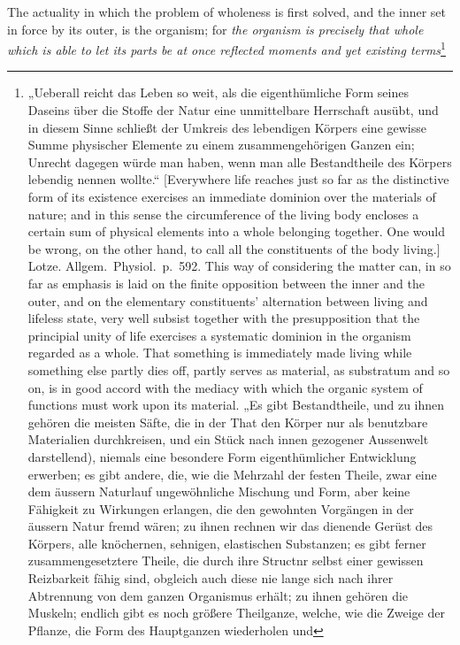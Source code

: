 \documentclass[12pt,a4paper]{book}
\begin{document}
The actuality in which the problem of wholeness is first solved, and the inner
set in force by its outer, is the organism; for \emph{the organism is precisely
that whole which is able to let its parts be at once reflected moments and yet
existing terms}\footnote{„Ueberall reicht das Leben so
weit, als die eigenthümliche Form seines Daseins über die Stoffe der
Natur eine unmittelbare Herrschaft ausübt, und in diesem Sinne schließt
der Umkreis des lebendigen Körpers eine gewisse Summe physischer
Elemente zu einem zusammengehörigen Ganzen ein; Unrecht dagegen würde
man haben, wenn man alle Bestandtheile des Körpers lebendig nennen
wollte.“ [Everywhere life reaches just so far as the distinctive form of its
existence exercises an immediate dominion over the materials of nature; and in
this sense the circumference of the living body encloses a certain sum of
physical elements into a whole belonging together. One would be wrong, on the
other hand, to call all the constituents of the body living.] Lotze. Allgem.\
Physiol.\ p.~592. This way of considering the matter can, in so far as emphasis
is laid on the finite opposition between the inner and the outer, and on the
elementary constituents' alternation between living and lifeless state, very
well subsist together with the presupposition that the principial unity of life
exercises a systematic dominion in the organism regarded as a whole. That
something is immediately made living while something else partly dies off,
partly serves as material, as substratum and so on, is in good accord with the
mediacy with which the organic system of functions must work upon its material.
„Es gibt Bestandtheile, und
zu ihnen gehören die meisten Säfte, die in der That den Körper nur als
benutzbare Materialien durchkreisen, und ein Stück nach innen gezogener
Aussenwelt darstellend), niemals eine besondere Form eigenthümlicher
Entwicklung erwerben; es gibt andere, die, wie die Mehrzahl der festen
Theile, zwar eine dem äussern Naturlauf ungewöhnliche Mischung und Form,
aber keine Fähigkeit zu Wirkungen erlangen, die den gewohnten Vorgängen
in der äussern Natur fremd wären; zu ihnen rechnen wir das dienende
Gerüst des Körpers, alle knöchernen, sehnigen, elastischen Substanzen;
es gibt ferner zusammengesetztere Theile, die durch ihre Structnr selbst
einer gewissen Reizbarkeit fähig sind, obgleich auch diese nie lange
sich nach ihrer Abtrennung von dem ganzen Organismus erhält; zu ihnen
gehören die Muskeln; endlich gibt es noch größere Theilganze, welche,
wie die Zweige der Pflanze, die Form des Hauptganzen wiederholen und
}
\end{document}
